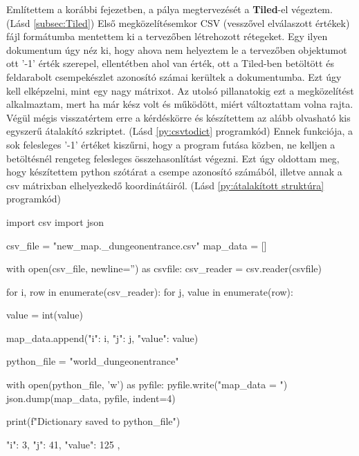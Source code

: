 \indent \indent Említettem a korábbi fejezetben, a pálya megtervezését a \textbf{Tiled}-el végeztem. (Lásd \ref{subsec:Tiled}) 
Első megközelítésemkor CSV (vesszővel elválaszott értékek) fájl formátumba mentettem ki a tervezőben létrehozott rétegeket. Egy ilyen dokumentum úgy néz ki, hogy ahova nem helyeztem le a tervezőben objektumot ott '-1' érték szerepel, ellentétben ahol van érték, ott a Tiled-ben betöltött és feldarabolt csempekészlet azonosító számai kerültek a dokumentumba. Ezt úgy kell elképzelni, mint egy nagy mátrixot. Az utolsó pillanatokig ezt a megközelítést alkalmaztam, mert ha már kész volt és működött, miért változtattam volna rajta. Végül mégis visszatértem erre a kérdéskörre és készítettem az alább olvasható kis egyszerű átalakító szkriptet. (Lásd \ref{py:csvtodict} programkód) Ennek funkciója, a sok felesleges '-1' értéket kiszűrni, hogy a program futása közben, ne kelljen a betöltésnél rengeteg felesleges összehasonlítást végezni. Ezt úgy oldottam meg, hogy készítettem python szótárat a csempe azonosító számából, illetve annak a csv mátrixban elhelyezkedő koordinátáiról. (Lásd \ref{py:átalakított struktúra} programkód)


\begin{python}[caption={CSV formátum dictionary formátumra konvertálása},label=py:csvtodict]
    import csv
    import json
    
    csv_file = "new_map\MSmap._dungeonentrance.csv"
    map_data = []
    
    with open(csv_file, newline='') as csvfile:
        csv_reader = csv.reader(csvfile)
    
        for i, row in enumerate(csv_reader):
            for j, value in enumerate(row):
    
                value = int(value)
    
                    map_data.append({"i": i, "j": j, "value": value})
    
    python_file = "world_dungeonentrance"
    
    with open(python_file, 'w') as pyfile:
        pyfile.write("map_data = ")
        json.dump(map_data, pyfile, indent=4)
    
    print(f"Dictionary saved to {python_file}")
    
\end{python}


\begin{python}[caption={Minta az átalakított struktúrára
    }, label=py:átalakított struktúra]
    {
        "i": 3,
        "j": 41,
        "value": 125
    },
\end{python}

